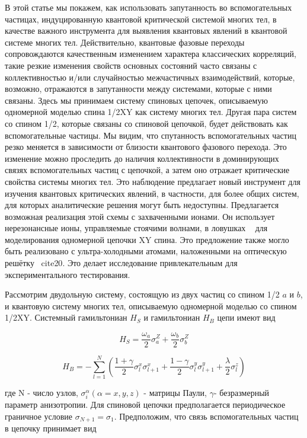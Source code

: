 \documentclass[11pt]{article}
\begin{document}
В этой статье мы покажем, как использовать запутанность во вспомогательных частицах, индуцированную квантовой критической системой многих тел, в качестве важного инструмента для выявления квантовых явлений в квантовой системе многих тел. Действительно, квантовые фазовые переходы сопровождаются качественным изменением характера классических корреляций, такие резкие изменения свойств основных состояний часто связаны с коллективностью и/или случайностью межчастичных взаимодействий, которые, возможно, отражаются в запутанности между системами, которые с ними связаны. Здесь мы принимаем систему спиновых цепочек, описываемую одномерной моделью спина 1/2XY как систему многих тел. Другая пара систем со спином 1/2, которые связаны со спиновой цепочкой, будет действовать как вспомогательные частицы. Мы видим, что спутанность вспомогательных частиц резко меняется в зависимости от близости квантового фазового перехода. Это изменение можно проследить до наличия коллективности в доминирующих связях вспомогательных частиц с цепочкой, а затем оно отражает критические свойства системы многих тел. Это наблюдение предлагает новый инструмент для изучения квантовых критических явлений, в частности, для более общих систем, для которых аналитические решения могут быть недоступны. Предлагается возможная реализация этой схемы с захваченными ионами. Он использует нерезонансные ионы, управляемые стоячими волнами, в ловушках ~\cite{b18,b19} для моделирования одномерной цепочки XY спина. Это предложение также могло быть реализовано с ультра-холодными атомами, наложенными на оптическую решётку ~cite{20}. Это делает исследование привлекательным для экспериментального тестирования.

Рассмотрим двудольную систему, состоящую из двух частиц со спином 1/2 $a$ и $b$, и квантовую систему многих тел, описываемую одномерной моделью со спином 1/2XY. Системный гамильтониан $H_S$ и гамильтониан $H_B$ цепи имеют вид


\begin{equation*}
H_S=\frac{\omega_a}{2}\sigma_a^Z+\frac{\omega_b}{2}\sigma_b^Z
\end{equation*}

\begin{equation}
H_B=-\sum\limits_{l=1}^N(\frac{1+\gamma}{2}\sigma_l^x\sigma_{l+1}^x
+ \frac{1-\gamma}{2}\sigma_l^y\sigma_{l+1}^y
+ \frac{\lambda}{2}\sigma_l^z
)
\label{eq_1}
\end{equation}

где N - число узлов, $\sigma_i^\alpha(\alpha=x,y,z)$ - матрицы Паули, $\gamma$- безразмерный параметр анизотропии. Для спиновой цепочки предполагается периодическое граничное условие $\sigma_{N + 1} = \sigma_1$. Предположим, что связь вспомогательных частиц в цепочку принимает вид
\end{document}
